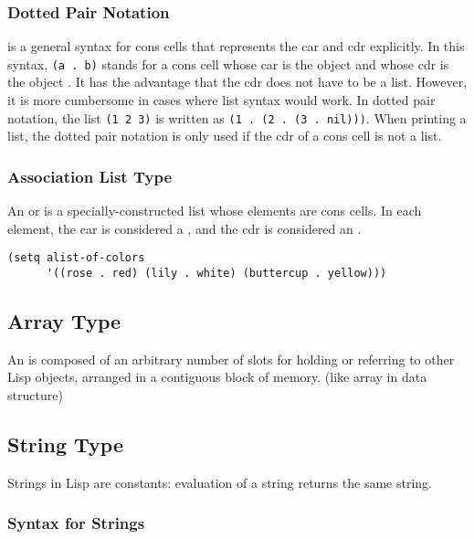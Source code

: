 \subsubsection{Dotted Pair Notation}
\label{sec:dotted-pair-notation}

 is a general syntax for cons cells that represents the car and cdr explicitly.
In this syntax, \lstinline|(a . b)| stands for a cons cell whose car is the object  and whose cdr is the object .
It has the advantage that the cdr does not have to be a list.
However, it is more cumbersome in cases where list syntax would work.
In dotted pair notation, the list \lstinline|(1 2 3)| is written as \lstinline|(1 . (2 . (3 . nil)))|.
When printing a list, the dotted pair notation is only used if the cdr of a cons cell is not a list.


\subsubsection{Association List Type}
\label{sec:assoc-list-type}


An  or  is a specially-constructed list whose elements are cons cells.
In each element, the car is considered a , and the cdr is considered an .
\begin{lstlisting}
(setq alist-of-colors
      '((rose . red) (lily . white) (buttercup . yellow)))
\end{lstlisting}

\subsection{Array Type}
\label{sec:array-type}

An  is composed of an arbitrary number of slots for holding or referring to other Lisp objects, arranged in a contiguous block of memory.
(like array in data structure)

\subsection{String Type}
\label{sec:string-type}

Strings in Lisp are constants: evaluation of a string returns the same string.


\subsubsection{Syntax for Strings}
\label{sec:syntax-strings}


